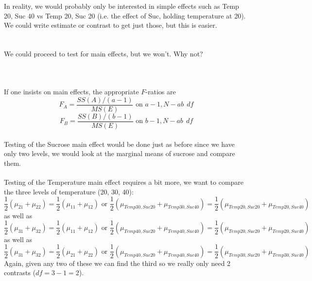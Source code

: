 In reality, we would probably only be interested in simple effects such as Temp 20, Suc 40 vs Temp 20, Suc 20 (i.e. the effect of Suc, holding temperature at 20).  We could write estimate or contrast to get just those, but this is easier.\\~\\~\\

We could proceed to test for main effects, but we won't.  Why not?\\~\\~\\~\\
If one insists on main effects, the appropriate $F$-ratios are
$$ F_A = \frac{SS(A)/(a-1)}{MS(E)} \mbox { on }a-1,N-ab \ \ df $$
$$ F_B = \frac{SS(B)/(b-1)}{MS(E)} \mbox { on }b-1,N-ab \ \ df$$ ~\\

Testing of the Sucrose main effect would be done just as before since we have only two levels, we would look at the marginal means of sucrose and compare them.\\~\\
Testing of the Temperature main effect requires a bit more, we want to compare the three levels of temperature (20, 30, 40):
$$\frac{1}{2}(\mu_{21}+\mu_{22})=\frac{1}{2}(\mu_{11}+\mu_{12}) \mbox{ or }\frac{1}{2}(\mu_{Temp30,Suc20}+\mu_{Temp30,Suc40})=\frac{1}{2}(\mu_{Temp20,Suc20}+\mu_{Temp20,Suc40})$$
as well as
$$\frac{1}{2}(\mu_{31}+\mu_{32})=\frac{1}{2}(\mu_{11}+\mu_{12}) \mbox{ or }\frac{1}{2}(\mu_{Temp40,Suc20}+\mu_{Temp40,Suc40})=\frac{1}{2}(\mu_{Temp20,Suc20}+\mu_{Temp20,Suc40})$$
as well as
$$\frac{1}{2}(\mu_{31}+\mu_{32})=\frac{1}{2}(\mu_{21}+\mu_{22}) \mbox{ or }\frac{1}{2}(\mu_{Temp40,Suc20}+\mu_{Temp40,Suc40})=\frac{1}{2}(\mu_{Temp30,Suc20}+\mu_{Temp30,Suc40})$$
Again, given any two of these we can find the third so we really only need 2 contrasts ($df = 3-1 = 2$).

